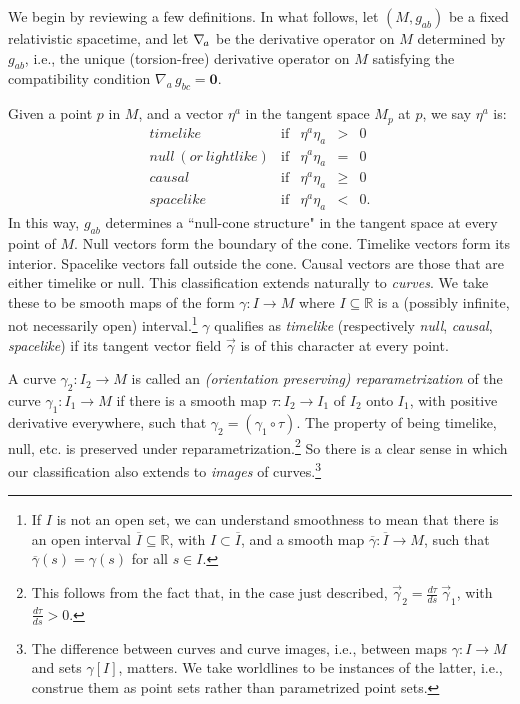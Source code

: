 \documentclass [12] {article}
\theoremstyle{plain}
\numberwithin{figure}{subsection}
\numberwithin{proposition}{subsection}
\begin{document}
We begin by reviewing a few definitions.  In what follows, let $(M, g_{ab})$ be a fixed  relativistic spacetime, and let $\nabla_{\hspace{-.1em} a}$ be the derivative operator on $M$ determined by $g_{ab}$, i.e.,  the unique (torsion-free) derivative operator on $M$ satisfying the compatibility condition  $\nabla_{\! a} \, g_{bc} = \textbf{0}$.
 
 Given a point $p$ in $M$, and a vector $\eta^a$ in the tangent space $M_p$ at $p$,  we say $\eta^a$ is:
\[
\begin{array}{lllll}
     timelike  & \textrm{if} & \eta^a \eta_a  &  > & 0 \\
      null  \  (or \  lightlike) & \textrm{if} & \eta^a \eta_a  & = & 0  \\     
            causal  & \textrm{if} & \eta^a \eta_a  &  \geq & 0 \\ 
               spacelike  & \textrm{if} & \eta^a \eta_a  &  < & 0.         
    \end{array}
    \]
In this way, $g_{ab}$ determines a ``null-cone structure" in the tangent space at every point of $M$.  Null vectors form the boundary of the cone. Timelike vectors form its interior.  Spacelike vectors fall outside the cone.  Causal vectors are those that are either timelike or null. 
This classification extends naturally to \emph{curves}.  We take these to be smooth maps of the form $\gamma \! \! : I \rightarrow M$ where $I \subseteq \mathbb{R}$ is a (possibly infinite, not necessarily open) interval.\footnote{If $I$ is not an open set, we can understand smoothness to mean that there is an open interval $\overline{I} \subseteq \mathbb{R}$, with $I \subset \overline{I} $, and a smooth map $\overline{\gamma} \! \! : \overline{I} \rightarrow M$, such that $\overline{\gamma}(s) = \gamma(s)$ for all $s \in I$.}   $\gamma$ qualifies  as  \emph{timelike} (respectively \emph{null},  \emph{causal}, \emph{spacelike}) if its  tangent vector field $\vec{\gamma}$ is of this character at every point. 

A curve $\gamma_2 \! \! : I_2 \rightarrow M$ is called an \emph{(orientation preserving) reparametrization} of the curve $\gamma_1 \! \! : I_1 \rightarrow M$ if there is a smooth map $\tau \! \! : I_2 \rightarrow I_1$ of $I_2$ onto $I_1$, with positive derivative everywhere, such that $\gamma_2 = (\gamma_1 \circ \tau)$.  The property of being timelike, null, etc. is preserved under reparametrization.\footnote{This follows from the fact that, in the case just  described, $\vec{\gamma}_2  =  \frac{d\tau}{ds} \ \vec{\gamma}_1$, with $\frac{d\tau}{ds} > 0$. } So there is a clear sense in which our  classification also extends to \emph{images} of curves.\footnote{The difference between curves and curve images, i.e., between maps  $\gamma \! \! : I \rightarrow M$ and  sets $\gamma[I]$, matters. We take worldlines  to be instances of the latter, i.e., construe them as point sets rather than parametrized point sets.}  
   
\end{document}
